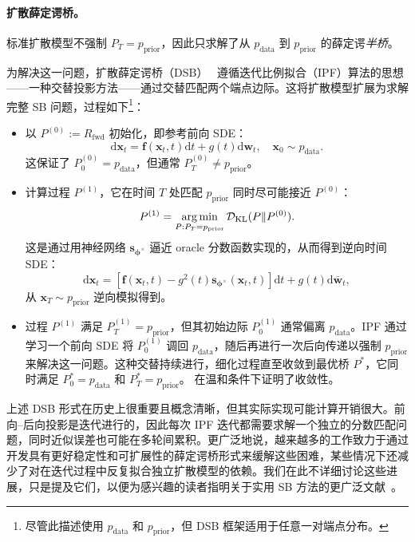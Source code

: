\paragraph{扩散薛定谔桥。} 
标准扩散模型不强制 $P_T = p_{\mathrm{prior}}$，因此只求解了从 $p_{\mathrm{data}}$ 到 $p_{\mathrm{prior}}$ 的薛定谔\emph{半桥}。

为解决这一问题，扩散薛定谔桥（DSB）~\citep{de2021diffusion} 遵循迭代比例拟合（IPF）算法的思想——一种交替投影方法——通过交替匹配两个端点边际。这将扩散模型扩展为求解完整 SB 问题，过程如下\footnote{尽管此描述使用 $p_{\mathrm{data}}$ 和 $p_{\mathrm{prior}}$，但 DSB 框架适用于任意一对端点分布。}：

\begin{itemize}
    \item {} 以 $P^{(0)} := R_{\text{fwd}}$ 初始化，即参考前向 SDE：
    \[
        \mathrm{d} \mathbf{x}_t = \mathbf{f}(\mathbf{x}_t, t)   \mathrm{d} t + g(t)   \mathrm{d} \mathbf{w}_t, \quad \mathbf{x}_0 \sim p_{\text{data}}.
    \]
    这保证了 $P_0^{(0)} = p_{\text{data}}$，但通常 $P_T^{(0)} \neq p_{\text{prior}}$。

    \item {} 计算过程 $P^{(1)}$，它在时间 $T$ 处匹配 $p_{\text{prior}}$ 同时尽可能接近 $P^{(0)}$：
    \[
        P^{(1)} = \operatorname*{arg\,min}_{P : P_T = p_{\text{prior}}} \mathcal{D}_{\text{KL}}(P  \|  P^{(0)}).
    \]
    这是通过用神经网络 $\mathbf{s}_{\bm{\phi}^\times}$ 逼近 oracle 分数函数实现的，从而得到逆向时间 SDE：
    \[
        \mathrm{d} \mathbf{x}_t = \left[ \mathbf{f}(\mathbf{x}_t, t) - g^2(t) \mathbf{s}_{\bm{\phi}^\times}(\mathbf{x}_t, t) \right] \mathrm{d} t + g(t)  \mathrm{d} \bar{\mathbf{w}}_t,
    \]
    从 $\mathbf{x}_T \sim p_{\text{prior}}$ 逆向模拟得到。
    
    \item {} 过程 $P^{(1)}$ 满足 $P_T^{(1)} = p_{\text{prior}}$，但其初始边际 $P_0^{(1)}$ 通常偏离 $p_{\text{data}}$。IPF 通过学习一个前向 SDE 将 $P_0^{(1)}$ 调回 $p_{\text{data}}$，随后再进行一次后向传递以强制 $p_{\text{prior}}$ 来解决这一问题。这种交替持续进行，细化过程直至收敛到最优桥 $P^*$，它同时满足 $P_0^* = p_{\text{data}}$ 和 $P_T^* = p_{\text{prior}}$。\citet{de2021diffusion} 在温和条件下证明了收敛性。
\end{itemize}


上述 DSB 形式在历史上很重要且概念清晰，但其实际实现可能计算开销很大。前向--后向投影是迭代进行的，因此每次 IPF 迭代都需要求解一个独立的分数匹配问题，同时近似误差也可能在多轮间累积。更广泛地说，越来越多的工作致力于通过开发具有更好稳定性和可扩展性的薛定谔桥形式来缓解这些困难，某些情况下还减少了对在迭代过程中反复拟合独立扩散模型的依赖。我们在此不详细讨论这些进展，只是提及它们，以便为感兴趣的读者指明关于实用 SB 方法的更广泛文献~\citep{shi2023dsbm,liu2024gsbm}。



